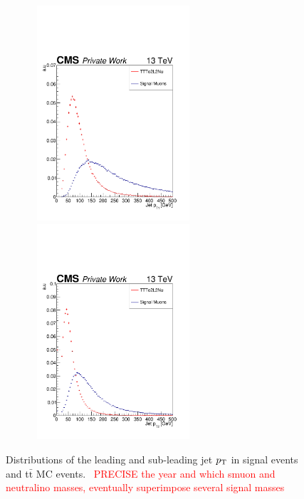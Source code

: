 \documentclass{cernatlasnote}
\newcommand{\ttbar}{t$\bar{\text{t}}$\xspace}
\newcommand{\pt}{$p_{\text T}$\xspace}
\begin{document}
\begin{appendices}
\begin{figure}[ht]
\centering
\includegraphics[height=8cm, width=8cm, trim= 0cm 0cm 0cm 0.cm,clip]{images/Jet/JetLeadingPt.pdf}\includegraphics[height=8cm, width=8cm, trim= 0cm 0cm 0cm 0.cm,clip]{images/Jet/JetLeadingPt2.pdf}
\caption{\label{fig:JetPt} Distributions of the leading and sub-leading jet \pt in signal events and \ttbar MC events.
~\textcolor{red}{PRECISE the year and which smuon and neutralino masses, eventually superimpose several signal masses}
}
\end{figure}
\FloatBarrier


\end{appendices}
\end{document}
